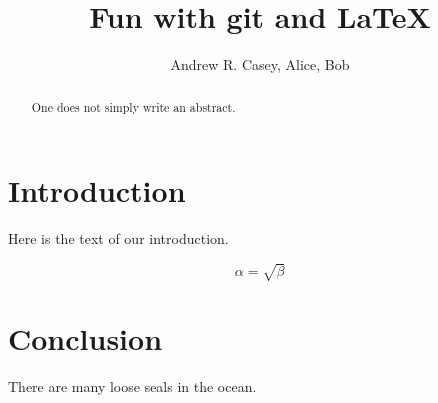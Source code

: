 \documentclass{article}
\begin{document}
\title{Fun with git and \LaTeX{}}
\author{Andrew R. Casey, Alice, Bob}

\maketitle

\begin{abstract}
One does not simply write an abstract.
\end{abstract}

\section{Introduction}
Here is the text of our introduction.

\begin{equation}
    \label{simple_equation}
    \alpha = \sqrt{ \beta }
\end{equation}


\section{Conclusion}
There are many loose seals in the ocean.
\end{document}
